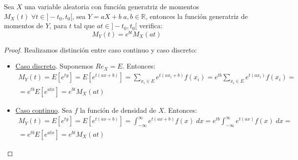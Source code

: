 \begin{prop}
    Sea $X$ una variable aleatoria con función generatriz de momentos $M_X(t)\;\forall t \in ]-t_0, t_0[$, sea $Y = aX +b\;a, b \in \mathbb{R}$, entonces la función generatriz de momentos de $Y$, para $t$ tal que $at \in ]-t_0, t_0[$ verifica:
    \begin{equation*}
        M_Y(t) = e^{bt}M_X(at)
    \end{equation*}
\end{prop}
\begin{proof}
    Realizamos distinción entre caso continuo y caso discreto:
    \begin{itemize}
        \item \underline{Caso discreto}. Suponemos $Re_X = E$. Entonces:
        \begin{multline*}
            M_Y(t) = E[e^{ty}] = E[e^{t(ax+b)}] = \sum_{x_i\in E} e^{t(ax_i+b)}f(x_i)
            = e^{tb}\sum_{x_i\in E} e^{t(ax_i)}f(x_i)
            =\\= e^{tb}E[e^{atx}] = e^{bt}M_X(at)
        \end{multline*}

        \item \underline{Caso continuo}. Sea $f$ la función de densidad de $X$. Entonces:
        \begin{multline*}
            M_Y(t) = E[e^{ty}] = E[e^{t(ax+b)}] = \int_{-\infty}^{\infty} e^{t(ax+b)}f(x)\;dx
            = e^{tb}\int_{-\infty}^{\infty} e^{t(ax)}f(x)\;dx
            =\\= e^{tb}E[e^{atx}] = e^{bt}M_X(at)
        \end{multline*}
    \end{itemize}
\end{proof}
